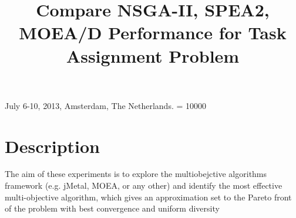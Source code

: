 \documentclass{sig-alternate}
\begin{document}
%
  {July 6-10, 2013, Amsterdam, The Netherlands.}
    \widowpenalty = 10000

\title{Compare NSGA-II, SPEA2, MOEA/D Performance for Task Assignment Problem}
%
%
%
%
%

%

\maketitle
\section{Description}
The aim of these experiments is to explore the multiobejctive algorithms framework (e.g. jMetal, MOEA, or any other) and identify the most effective multi-objective algorithm, which gives an approximation set to the Pareto front of the problem with best convergence and uniform diversity
\end{document}
